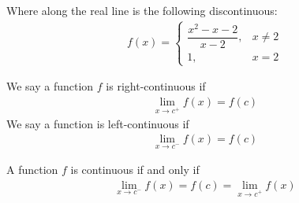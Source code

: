 \begin{exercise}
Where along the real line is the following discontinuous:
\begin{align*}
    f(x) = 
    \begin{cases}
    \dfrac{x^{2}-x-2}{x-2}, &x \neq 2 \\
    1, & x=2
    \end{cases}
\end{align*}
\end{exercise}

\begin{definition}
We say a function $f$ is right-continuous if
\begin{align*}
    \lim_{x \longrightarrow c^{+}} f(x) = f(c)
\end{align*}
We say a function is left-continuous if
\begin{align*}
    \lim_{x \longrightarrow c^{-}} f(x) = f(c)
\end{align*}
\end{definition}

\begin{theorem}
A function $f$ is continuous if and only if
\begin{align*}
    \lim_{x \longrightarrow c^{-}} f(x) = f(c) = \lim_{x \longrightarrow c^{+}} f(x) 
\end{align*}
\end{theorem}


